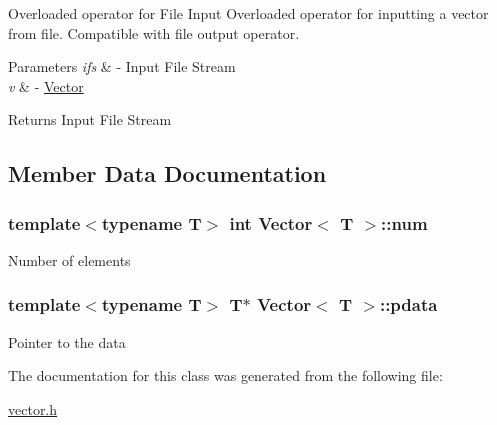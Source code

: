 Overloaded operator for File Input Overloaded operator for inputting a vector from file. Compatible with file output operator. 


\begin{DoxyParams}{Parameters}
{\em ifs} & -\/ Input File Stream \\
\hline
{\em v} & -\/ \hyperlink{class_vector}{Vector} \\
\hline
\end{DoxyParams}
\begin{DoxyReturn}{Returns}
Input File Stream 
\end{DoxyReturn}


\subsection{Member Data Documentation}
\hypertarget{class_vector_ab22f5c6b6b9110d18705354e62a8e0e6}{
\subsubsection[{num}]{\setlength{\rightskip}{0pt plus 5cm}template$<$typename T$>$ int {\bf Vector}$<$ T $>$\-::num\hspace{0.3cm}{\ttfamily [protected]}}}\label{class_vector_ab22f5c6b6b9110d18705354e62a8e0e6}
Number of elements \hypertarget{class_vector_a2eb967804ab083f77c2a8238cc060498}{
\subsubsection[{pdata}]{\setlength{\rightskip}{0pt plus 5cm}template$<$typename T$>$ T$\ast$ {\bf Vector}$<$ T $>$\-::pdata\hspace{0.3cm}{\ttfamily [protected]}}}\label{class_vector_a2eb967804ab083f77c2a8238cc060498}
Pointer to the data 

The documentation for this class was generated from the following file\-:\begin{DoxyCompactItemize}
\item 
\hyperlink{vector_8h}{vector.\-h}\end{DoxyCompactItemize}
